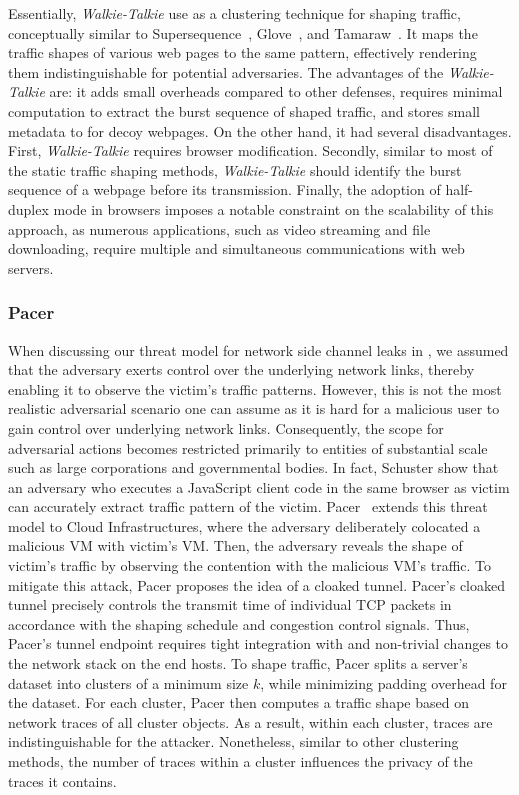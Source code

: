 Essentially, \textit{Walkie-Talkie} use as a clustering technique for shaping traffic, conceptually similar to Supersequence~\cite{wang2014supersequence}, Glove~\cite{nithyanand2014glove}, and Tamaraw~\cite{cai2014systematic}.
It maps the traffic shapes of various web pages to the same pattern, effectively rendering them indistinguishable for potential adversaries.
The advantages of the \textit{Walkie-Talkie} are: it adds small overheads compared to other defenses, requires minimal computation to extract the burst sequence of shaped traffic, and stores small metadata to for decoy webpages.
On the other hand, it had several disadvantages. 
First, \textit{Walkie-Talkie} requires browser modification.  
Secondly, similar to most of the static traffic shaping methods, \textit{Walkie-Talkie} should identify the burst sequence of a webpage before its transmission.
Finally, the adoption of half-duplex mode in browsers imposes a notable constraint on the scalability of this approach, as numerous applications, such as video streaming and file downloading, require multiple and simultaneous communications with web servers.


\subsubsection{Pacer}
When discussing our threat model for network side channel leaks in , we assumed that the adversary exerts control over the underlying network links, thereby enabling it to observe the victim's traffic patterns.
However, this is not the most realistic adversarial scenario one can assume as it is hard for a malicious user to gain control over underlying network links.
Consequently, the scope for adversarial actions becomes restricted primarily to entities of substantial scale such as large corporations and governmental bodies.
In fact, Schuster show that an adversary who executes a JavaScript client code in the same browser as victim can accurately extract traffic pattern of the victim.
Pacer~\cite{mehta2022pacer} extends this threat model to Cloud Infrastructures, where the adversary deliberately colocated a malicious VM with victim's VM.
Then, the adversary reveals the shape of victim's traffic by observing the contention with the malicious VM's traffic.
To mitigate this attack, Pacer \cite{mehta2022pacer} proposes the idea of a cloaked tunnel.
Pacer's cloaked tunnel precisely controls the transmit time of individual
TCP packets in accordance with the shaping schedule and congestion control
signals.
Thus, Pacer's tunnel endpoint requires tight integration with and
non-trivial changes to the network stack on the end hosts.
To shape traffic, Pacer splits a server's dataset into clusters of a minimum size $k$, while minimizing padding overhead for the dataset.
For each cluster, Pacer then computes a traffic shape based on network traces of all cluster objects.
As a result, within each cluster, traces are indistinguishable for the attacker. 
Nonetheless, similar to other clustering methods, the number of traces within a cluster influences the privacy of the traces it contains.



